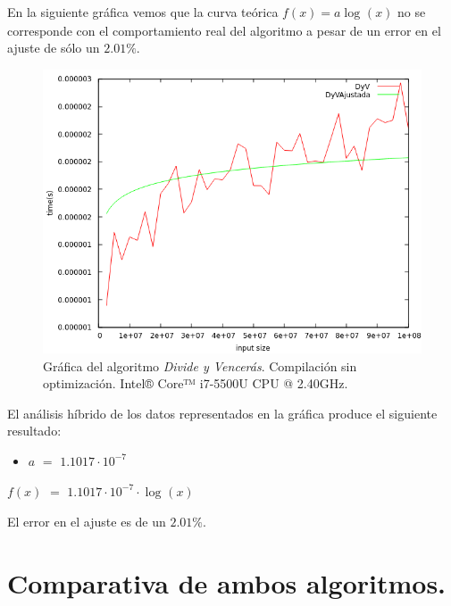 \documentclass[11pt,a4paper]{article}
\begin{document}
			\par
			En la siguiente gráfica vemos que la curva teórica $f(x) = a \log_{}(x)$ no se corresponde con el comportamiento real del algoritmo a pesar de un error en el ajuste de sólo un $2.01\%$. 

			\begin{figure}[h]

				\centering
				\includegraphics[width=1\textwidth]{DyVAjustada.png}
				\caption{Gráfica del algoritmo \textit{Divide y Vencerás}. Compilación sin optimización. Intel® Core™ i7-5500U CPU @ 2.40GHz.}

			\end{figure}

			\par
			El análisis híbrido de los datos representados en la gráfica produce el siguiente resultado:

			\begin{itemize}

				\item
				$a$ $=$ $1.1017\cdot 10^{-7}$

			\end{itemize}

			\par
			$f(x)$ $=$ $ 1.1017\cdot 10^{-7}\cdot \log_{}(x)$

			\vspace{5mm}

			\par
			El error en el ajuste es de un $2.01\%$.

\newpage

	\section{Comparativa de ambos algoritmos.}
\end{document}

